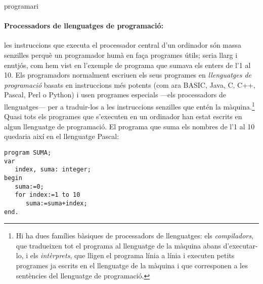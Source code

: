 \begin{persabermes}{programari}
  \paragraph{Processadors de llenguatges de programació:} les
  instruccions que executa el processador central d'un ordinador són
  massa senzilles perquè un programador humà en faça programes útils;
  seria llarg i enutjós, com hem vist en l'exemple de programa que
  sumava els enters de l'1 al 10.  Els programadors normalment escriuen
  els seus programes en {\em llenguatges de programació} basats en
  instruccions més potents (com ara BASIC, Java, C, C++, Pascal, Perl o
  Python) i usen programes especials ---els processadors de
  llenguatges--- per a traduir-los a les instruccions senzilles que
  entén la màquina.\footnote{Hi ha dues famílies bàsiques de processadors
    de llenguatges: els \emph{compiladors}, que tradueixen tot el
    programa al llenguatge de la màquina abans d'executar-lo, i els
    \emph{intèrprets}, que lligen el programa línia a línia i executen
    petits programes ja escrits en el llenguatge de la màquina i que
    corresponen a les sentències del llenguatge de programació.} Quasi
  tots els programes que s'executen en un ordinador han estat escrits en
  algun llenguatge de programació. El programa que suma els nombres de
  l'1 al 10 quedaria així en el llenguatge Pascal:
\begin{verbatim}
program SUMA;
var
   index, suma: integer;
begin
   suma:=0;
   for index:=1 to 10
      suma:=suma+index;
end.
\end{verbatim}



\end{persabermes}
